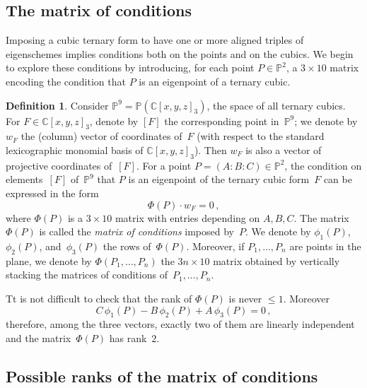 \documentclass[11pt, a4paper, reqno, captions=tableheading,bibliography=totoc]{scrartcl}
\theoremstyle{plain}
\theoremstyle{definition}
\newtheorem{definition}[lemma]{Definition}
\newcommand{\C}{\mathbb{C}}
\newcommand{\p}{\mathbb{P}}
\begin{document}
\subsection{The matrix of conditions}

Imposing a cubic ternary form to have one or more aligned triples of eigenschemes implies conditions both on the points and on the cubics.
We begin to explore these conditions by introducing, for each point $P \in \p^2$,
a $3 \times 10$ matrix encoding the condition that $P$ is an eigenpoint of a ternary cubic.

\begin{definition}
\label{definition:matrix_conditions}
 Consider $\p^9 = \p(\C[x,y,z]_3)$, the space of all ternary cubics.
 For $F \in \C[x,y,z]_3$, denote by $[F]$ the corresponding point in~$\p^9$; we denote by $w_F$ the (column) vector of coordinates of~$F$ (with respect to the standard lexicographic monomial basis of $\C[x,y,z]_3$). Then $w_F$ is also a vector of projective coordinates of~$[F]$.
 For a point $P = (A: B: C) \in \p^2$, the condition on elements~$[F]$ of~$\p^9$ that $P$ is an eigenpoint of the ternary cubic form~$F$ can be expressed in the form
 \[
  \Phi(P) \cdot w_F
  = 0 \,,
 \]
 where $\Phi(P)$ is a $3 \times 10$ matrix with entries depending on $A, B, C$.
 The matrix $\Phi(P)$ is called the \emph{matrix of conditions} imposed by~$P$.
We denote by $\phi_1(P)$, $\phi_2(P)$, and~$\phi_3(P)$ the rows of~$\Phi(P)$.
Moreover, if $P_1, \dotsc, P_n$ are points in the plane, we denote by $\Phi(P_1, \dotsc, P_n)$ the $3n \times 10$ matrix obtained by vertically stacking the matrices of conditions of~$P_1, \dotsc, P_n$.
\end{definition}

Tt is not difficult to check that the rank of $\Phi(P)$ is never $\leq 1$. Moreover
\begin{equation}
  C \, \phi_1(P) - B \, \phi_2(P) + A \, \phi_3(P) = 0 \,,
  \label{eq:base}
\end{equation}
therefore, among the three vectors, exactly two of them are linearly independent and the matrix~$\Phi(P)$ has rank~$2$.

\subsection{Possible ranks of the matrix of conditions}
\end{document}

